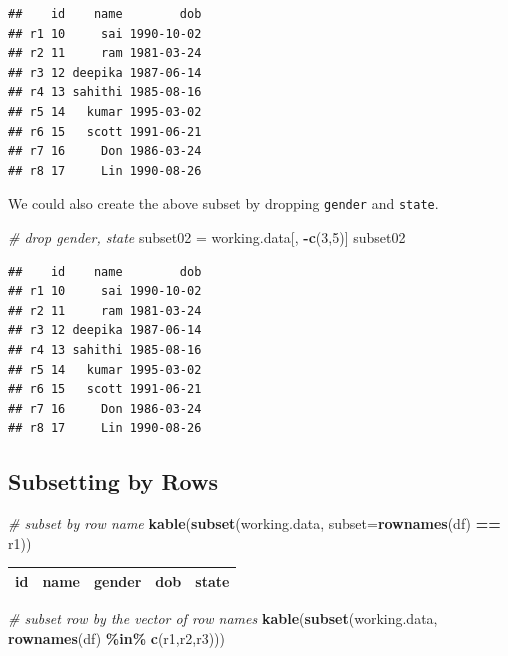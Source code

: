 \documentclass[
]{book}
\newenvironment{Shaded}{\begin{snugshade}}{\end{snugshade}}
\newcommand{\AttributeTok}[1]{\textcolor[rgb]{0.13,0.29,0.53}{#1}}
\newcommand{\CommentTok}[1]{\textcolor[rgb]{0.56,0.35,0.01}{\textit{#1}}}
\newcommand{\DecValTok}[1]{\textcolor[rgb]{0.00,0.00,0.81}{#1}}
\newcommand{\FunctionTok}[1]{\textcolor[rgb]{0.13,0.29,0.53}{\textbf{#1}}}
\newcommand{\NormalTok}[1]{#1}
\newcommand{\OtherTok}[1]{\textcolor[rgb]{0.56,0.35,0.01}{#1}}
\newcommand{\SpecialCharTok}[1]{\textcolor[rgb]{0.81,0.36,0.00}{\textbf{#1}}}
\newcommand{\StringTok}[1]{\textcolor[rgb]{0.31,0.60,0.02}{#1}}
\begin{document}
\begin{verbatim}
##    id    name        dob
## r1 10     sai 1990-10-02
## r2 11     ram 1981-03-24
## r3 12 deepika 1987-06-14
## r4 13 sahithi 1985-08-16
## r5 14   kumar 1995-03-02
## r6 15   scott 1991-06-21
## r7 16     Don 1986-03-24
## r8 17     Lin 1990-08-26
\end{verbatim}

We could also create the above subset by dropping \texttt{gender} and \texttt{state}.

\begin{Shaded}
\begin{Highlighting}[]
\CommentTok{\# drop gender, state}
\NormalTok{subset02 }\OtherTok{=}\NormalTok{ working.data[, }\SpecialCharTok{{-}}\FunctionTok{c}\NormalTok{(}\DecValTok{3}\NormalTok{,}\DecValTok{5}\NormalTok{)]}
\NormalTok{subset02}
\end{Highlighting}
\end{Shaded}

\begin{verbatim}
##    id    name        dob
## r1 10     sai 1990-10-02
## r2 11     ram 1981-03-24
## r3 12 deepika 1987-06-14
## r4 13 sahithi 1985-08-16
## r5 14   kumar 1995-03-02
## r6 15   scott 1991-06-21
## r7 16     Don 1986-03-24
## r8 17     Lin 1990-08-26
\end{verbatim}

\hypertarget{subsetting-by-rows}{%
\subsection{Subsetting by Rows}\label{subsetting-by-rows}}

\begin{Shaded}
\begin{Highlighting}[]
\CommentTok{\# subset by row name}
\FunctionTok{kable}\NormalTok{(}\FunctionTok{subset}\NormalTok{(working.data, }\AttributeTok{subset=}\FunctionTok{rownames}\NormalTok{(df) }\SpecialCharTok{==} \StringTok{\textquotesingle{}r1\textquotesingle{}}\NormalTok{))}
\end{Highlighting}
\end{Shaded}

\begin{tabular}{r|l|l|l|l}
\hline
id & name & gender & dob & state\\


\hline
\end{tabular}

\begin{Shaded}
\begin{Highlighting}[]
\CommentTok{\# subset row by the vector of row names}
\FunctionTok{kable}\NormalTok{(}\FunctionTok{subset}\NormalTok{(working.data, }\FunctionTok{rownames}\NormalTok{(df) }\SpecialCharTok{\%in\%} \FunctionTok{c}\NormalTok{(}\StringTok{\textquotesingle{}r1\textquotesingle{}}\NormalTok{,}\StringTok{\textquotesingle{}r2\textquotesingle{}}\NormalTok{,}\StringTok{\textquotesingle{}r3\textquotesingle{}}\NormalTok{)))}
\end{Highlighting}
\end{Shaded}
\end{document}
